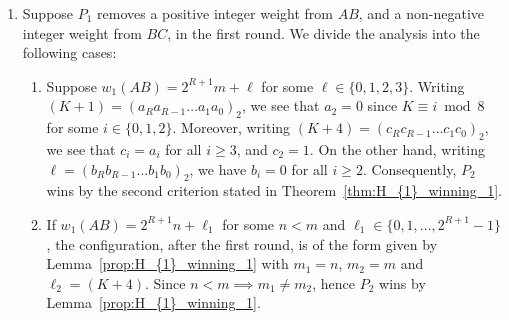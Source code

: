 \documentclass[11pt,reqno]{amsart}
\theoremstyle{definition}
\theoremstyle{definition}
\begin{document}
\begin{enumerate}
\item Suppose $P_{1}$ removes a positive integer weight from $AB$, and a non-negative integer weight from $BC$, in the first round. We divide the analysis into the following cases:
\begin{enumerate}
\item Suppose $w_{1}(AB)=2^{R+1}m+\ell$ for some $\ell \in \{0,1,2,3\}$. Writing $(K+1)=(a_{R}a_{R-1}\ldots a_{1}a_{0})_{2}$, we see that $a_{2}=0$ since $K \equiv i \bmod 8$ for some $i \in \{0,1,2\}$. Moreover, writing $(K+4)=(c_{R}c_{R-1}\ldots c_{1}c_{0})_{2}$, we see that $c_{i}=a_{i}$ for all $i \geqslant 3$, and $c_{2}=1$. On the other hand, writing $\ell=(b_{R}b_{R-1}\ldots b_{1}b_{0})_{2}$, we have $b_{i}=0$ for all $i \geqslant 2$. Consequently, $P_{2}$ wins by the second criterion stated in Theorem~\ref{thm:H_{1}_winning_1}.

\item If $w_{1}(AB)=2^{R+1}n+\ell_{1}$ for some $n < m$ and $\ell_{1} \in \{0,1,\ldots,2^{R+1}-1\}$, the configuration, after the first round, is of the form given by Lemma~\ref{prop:H_{1}_winning_1} with $m_{1}=n$, $m_{2}=m$ and $\ell_{2}=(K+4)$. Since $n<m \implies m_{1}\neq m_{2}$, hence $P_{2}$ wins by Lemma~\ref{prop:H_{1}_winning_1}.
\end{enumerate}


\end{enumerate}
\end{document}

